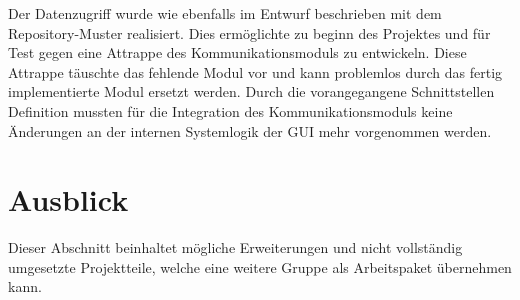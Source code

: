 Der Datenzugriff wurde wie ebenfalls im Entwurf beschrieben mit dem Repository-Muster realisiert. Dies ermöglichte zu beginn des Projektes und für Test gegen eine Attrappe des Kommunikationsmoduls  zu entwickeln. Diese Attrappe täuschte das fehlende Modul vor und kann problemlos durch das fertig implementierte Modul ersetzt werden. Durch die vorangegangene Schnittstellen Definition mussten für die Integration des Kommunikationsmoduls keine Änderungen an der internen Systemlogik der GUI mehr vorgenommen werden.   

\section{Ausblick}
Dieser Abschnitt beinhaltet mögliche Erweiterungen und nicht vollständig umgesetzte Projektteile, welche eine weitere Gruppe als Arbeitspaket übernehmen kann. 




